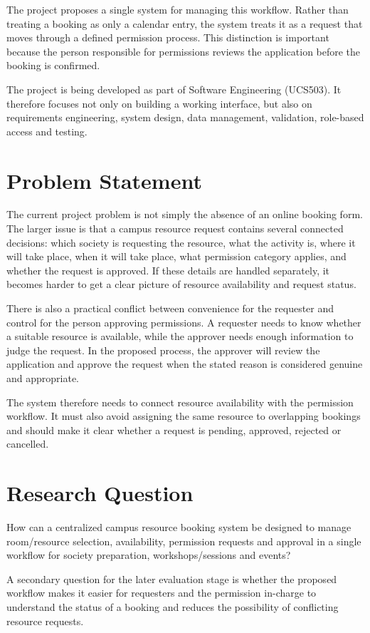 \documentclass[12pt]{article}
\begin{document}
The project proposes a single system for managing this workflow. Rather than treating a booking as only a calendar entry, the system treats it as a request that moves through a defined permission process. This distinction is important because the person responsible for permissions reviews the application before the booking is confirmed.

The project is being developed as part of Software Engineering (UCS503). It therefore focuses not only on building a working interface, but also on requirements engineering, system design, data management, validation, role-based access and testing.

\section{Problem Statement}
The current project problem is not simply the absence of an online booking form. The larger issue is that a campus resource request contains several connected decisions: which society is requesting the resource, what the activity is, where it will take place, when it will take place, what permission category applies, and whether the request is approved. If these details are handled separately, it becomes harder to get a clear picture of resource availability and request status.

There is also a practical conflict between convenience for the requester and control for the person approving permissions. A requester needs to know whether a suitable resource is available, while the approver needs enough information to judge the request. In the proposed process, the approver will review the application and approve the request when the stated reason is considered genuine and appropriate.

The system therefore needs to connect resource availability with the permission workflow. It must also avoid assigning the same resource to overlapping bookings and should make it clear whether a request is pending, approved, rejected or cancelled.

\section{Research Question}
How can a centralized campus resource booking system be designed to manage room/resource selection, availability, permission requests and approval in a single workflow for society preparation, workshops/sessions and events?

A secondary question for the later evaluation stage is whether the proposed workflow makes it easier for requesters and the permission in-charge to understand the status of a booking and reduces the possibility of conflicting resource requests.
\end{document}
